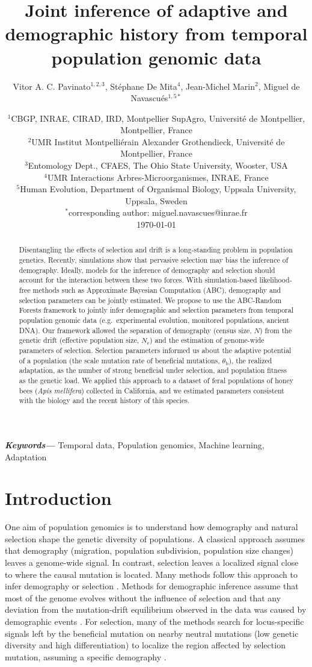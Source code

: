 \documentclass[a4paper, 12pt]{article}
\title{Joint inference of adaptive and demographic history from temporal population genomic data}
\author{\small
            Vitor A. C. Pavinato$^{1,2,3}$, Stéphane De Mita$^4$, Jean-Michel Marin$^2$, Miguel de Navascués$^{1,5*}$}
\date{{\footnotesize %
    $^1$CBGP, INRAE, CIRAD, IRD, Montpellier SupAgro, Université de Montpellier, Montpellier, France\\%
    $^2$UMR Institut Montpelliérain Alexander Grothendieck, Université de Montpellier, France \\%
    $^3$Entomology Dept., CFAES, The Ohio State University, Wooster, USA\\%
    $^4$UMR Interactions Arbres-Microorganismes, INRAE, France \\%
    $^5$Human Evolution, Department of Organismal Biology, Uppsala University, Uppsala, Sweden\\%
    $^*$corresponding author: miguel.navascues@inrae.fr\\[2ex]%
    }
    \footnotesize\today    
}
\providecommand{\keywords}[1]
{
  \small	
  \textbf{\textit{Keywords---}} #1
}
\begin{document}
\maketitle

\begin{abstract}
Disentangling the effects of selection and drift is a long-standing problem in population genetics. Recently, simulations show that pervasive selection may bias the inference of demography. Ideally, models for the inference of demography and selection should account for the interaction between these two forces.
With simulation-based likelihood-free methods such as Approximate Bayesian Computation (ABC), demography and selection parameters can be jointly estimated. We propose to use the ABC-Random Forests framework to jointly infer demographic and selection parameters from temporal population genomic data (e.g.\ experimental evolution, monitored populations, ancient DNA). Our framework allowed the separation of demography (census size, $N$) from the genetic drift (effective population size, $N_{\mathrm{e}}$) and the estimation of genome-wide parameters of selection. Selection parameters informed us about the adaptive potential of a population (the scale mutation rate of beneficial mutations, $\theta_{\mathrm{b}}$), the realized adaptation, as the number of strong beneficial under selection, and population fitness as the genetic load. We applied this approach to a dataset of feral populations of honey bees (\textit{Apis mellifera}) collected in California, and we estimated parameters consistent with the biology and the recent history of this species.
\end{abstract}\hspace{12pt}

\keywords{Temporal data, Population genomics, Machine learning, Adaptation}

\newpage

\section*{Introduction}

One aim of population genomics is to understand how demography and natural selection shape the genetic diversity of populations. A classical approach assumes that demography (migration, population subdivision, population size changes) leaves a genome-wide signal. In contrast, selection leaves a localized signal close to where the causal mutation is located. Many methods follow this approach to infer demography or selection \citep[reviewed by][]{Beichman:2018bx, Casillas:2017jv}. Methods for demographic inference assume that most of the genome evolves without the influence of selection and that any deviation from the mutation-drift equilibrium observed in the data was caused by demographic events \citep{Beichman:2018bx}. For selection, many of the methods search for locus-specific signals left by the beneficial mutation on nearby neutral mutations \citep{Tajima:1989un, Fay:2000dl, Kim:2004ih} (low genetic diversity and high differentiation) to localize the region affected by selection mutation, assuming a specific demography \citep[constant population size in early methods;][]{Nielsen:2005kx, Pool:2010eh}.
\end{document}
